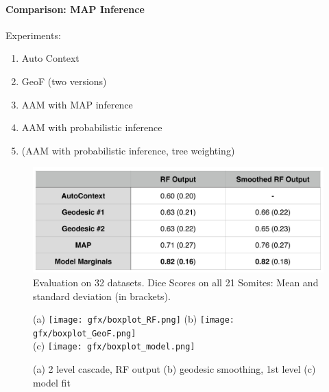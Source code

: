 \documentclass[10pt,twocolumn,letterpaper]{article}
\begin{document}
\paragraph{Comparison: MAP Inference}

Experiments:
\begin{enumerate}
\item Auto Context
\item GeoF (two versions)
\item AAM with MAP inference 
\item AAM with probabilistic inference 
\item (AAM with probabilistic inference, tree weighting)
\end{enumerate}

\begin{figure}[t]
\begin{center}
\includegraphics[width=\columnwidth]{TableDiceScores.jpg} %
\caption{Evaluation on 32 datasets. Dice Scores on all 21 Somites: Mean and standard deviation (in brackets).}
\label{tab:results}
\end{center}
\end{figure}

\begin{figure}[tb]
\centering
\small
\begin{center}
		(a) \texttt{[image: gfx/boxplot\_RF.png]} %
		(b) \texttt{[image: gfx/boxplot\_GeoF.png]} \\
		(c) \texttt{[image: gfx/boxplot\_model.png]} %
\end{center}
\label{boxplots}
\caption{ %
(a) 2 level cascade, RF output 
%
(b) geodesic smoothing, 1st level
%
(c) model fit}
\end{figure}
\end{document}
